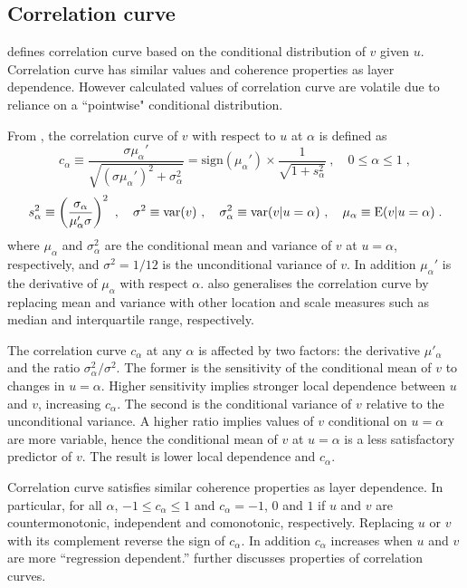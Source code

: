 \documentclass[authoryear]{elsarticle}
\newcommand{\var}{{\rm var}}
\newcommand{\E}{{\mathrm E}}
\newcommand{\sign}{\mathrm{sign}}
\newcommand{\cq}{\ ,\quad }
\begin{document}
\subsection{Correlation curve}

\cite{bjerve1993correlation} defines correlation curve based on the conditional distribution of $v$ given $u$. Correlation curve has similar values and coherence properties as layer dependence. However calculated values of correlation curve are volatile due to reliance on a ``pointwise" conditional distribution.

From \cite{bjerve1993correlation}, the correlation curve of $v$ with respect to $u$ at $\alpha$ is defined as
$$
c_\alpha \equiv \frac{\sigma\mu_\alpha'}{\sqrt{(\sigma\mu_\alpha')^2+\sigma_\alpha^2}} = \sign(\mu_\alpha') \times \frac{1}{\sqrt{1+s_\alpha^2}}
\cq 0\leq\alpha\leq 1 \;,
$$
$$
s_\alpha^2\equiv \left(\frac{\sigma_\alpha}{\mu_\alpha'\sigma}\right)^2  \cq \sigma^2\equiv \var(v) \cq \sigma_\alpha^2\equiv \var(v|u=\alpha)
\cq \mu_\alpha\equiv \E(v|u=\alpha) \;.
$$
where $\mu_\alpha$ and $\sigma_\alpha^2$ are the conditional mean and variance of $v$ at $u=\alpha$, respectively, and $\sigma^2=1/12$ is the unconditional variance of $v$. In addition $\mu_\alpha'$ is the derivative of $\mu_\alpha$ with respect $\alpha$. \cite{bjerve1993correlation} also generalises the correlation curve by replacing mean and variance with other location and scale measures such as median and interquartile range, respectively.


The correlation curve $c_\alpha$ at any $\alpha$ is affected by two factors: the derivative $\mu'_\alpha$ and the ratio $\sigma_\alpha^2/\sigma^2$. The former is the sensitivity of the conditional mean of $v$ to changes in $u=\alpha$. Higher sensitivity implies stronger local dependence between $u$ and $v$, increasing $c_\alpha$. The second is the conditional variance of $v$ relative to the unconditional variance. A higher ratio implies values of $v$ conditional on $u=\alpha$ are more variable, hence the conditional mean of $v$ at $u=\alpha$ is a less satisfactory predictor of $v$. The result is lower local dependence and $c_\alpha$.


Correlation curve satisfies similar coherence properties as layer dependence. In particular, for all $\alpha$, $-1\leq c_\alpha\leq 1$ and $c_\alpha=-1$, $0$ and $1$ if $u$ and $v$ are countermonotonic, independent and comonotonic, respectively. Replacing $u$ or $v$ with its complement reverse the sign of $c_\alpha$. In addition $c_\alpha$ increases when $u$ and $v$ are more ``regression dependent.'' \cite{bjerve1993correlation} further discusses properties of correlation curves.
\end{document}

